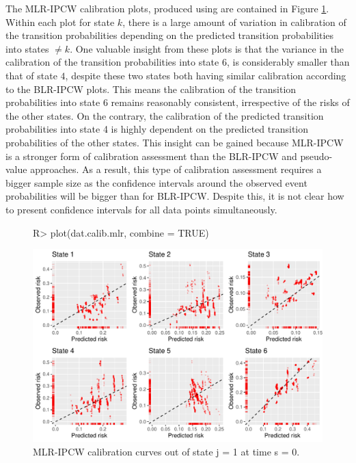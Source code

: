 \documentclass[article,shortnames]{jss}
\begin{document}
The MLR-IPCW calibration plots, produced using  are contained in Figure \ref{fig:mlrj1s0}. Within each plot for state $k$, there is a large amount of variation in calibration of the transition probabilities depending on the predicted transition probabilities into states $\neq k$. One valuable insight from these plots is that the variance in the calibration of the transition probabilities into state $6$, is considerably smaller than that of state $4$, despite these two states both having similar calibration according to the BLR-IPCW plots. This means the calibration of the transition probabilities into state 6 remains reasonably consistent, irrespective of the risks of the other states. On the contrary, the calibration of the predicted transition probabilities into state 4 is highly dependent on the predicted transition probabilities of the other states. This insight can be gained because MLR-IPCW is a stronger \citep{vanCalster2016} form of calibration assessment than the BLR-IPCW and pseudo-value approaches. As a result, this type of calibration assessment requires a bigger sample size as the confidence intervals around the observed event probabilities will be bigger than for BLR-IPCW. Despite this, it is not clear how to present confidence intervals for all data points simultaneously.

\begin{figure}
\centering
\begin{Schunk}
\begin{Sinput}
R> plot(dat.calib.mlr, combine = TRUE)
\end{Sinput}
\end{Schunk}
\includegraphics{calibmsm-jss-20230613-010}
\caption{\label{fig:mlrj1s0} MLR-IPCW calibration curves out of state j =  1 at time s = 0.}
\end{figure}
\end{document}
